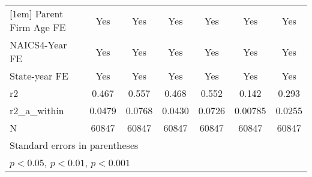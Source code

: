 {\begin{tabular}{l*{6}{c}}
[1em]
Parent Firm Age FE&         Yes         &         Yes         &         Yes         &         Yes         &         Yes         &         Yes         \\
[1em]
NAICS4-Year FE&         Yes         &         Yes         &         Yes         &         Yes         &         Yes         &         Yes         \\
[1em]
State-year FE&         Yes         &         Yes         &         Yes         &         Yes         &         Yes         &         Yes         \\
\hline
r2          &       0.467         &       0.557         &       0.468         &       0.552         &       0.142         &       0.293         \\
r2\_a\_within &      0.0479         &      0.0768         &      0.0430         &      0.0726         &     0.00785         &      0.0255         \\
N           &       60847         &       60847         &       60847         &       60847         &       60847         &       60847         \\
\hline\hline
\multicolumn{7}{l}{\footnotesize Standard errors in parentheses}\\
\multicolumn{7}{l}{\footnotesize \sym{*} \(p<0.05\), \sym{**} \(p<0.01\), \sym{***} \(p<0.001\)}\\
\end{tabular}
}

